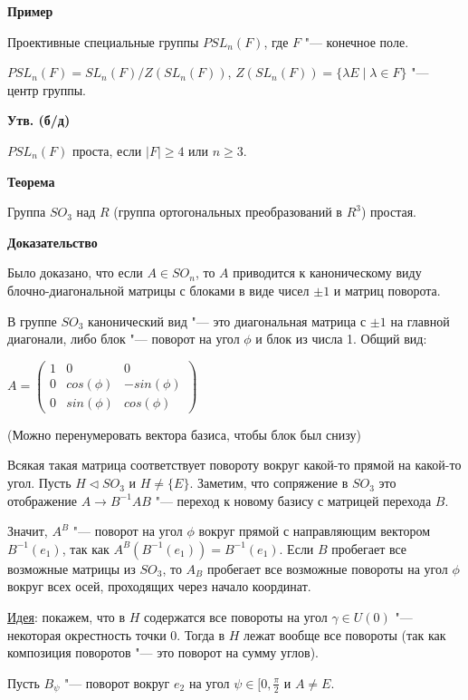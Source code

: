 \documentclass{article}
\begin{document}
\textbf{Пример}

Проективные специальные группы $PSL_n(F)$, где $F$ "--- конечное поле.

$PSL_n(F) = SL_n(F) / Z(SL_n(F))$, $Z(SL_n(F)) = \{\lambda E \mid \lambda \in F\}$ "--- центр группы.

\vspace{5pt}

\textbf{Утв. (б/д)}

$PSL_n(F)$ проста, если $|F| \geq 4$ или $n \geq 3$.

\textbf{Теорема}

Группа $SO_3$ над $R$ (группа ортогональных преобразований в $R^3$) простая.

\textbf{Доказательство}

Было доказано, что если $A \in SO_n$, то $A$ приводится к каноническому виду блочно-диагональной матрицы с блоками в виде чисел $\pm 1$ и матриц поворота.

В группе $SO_3$ канонический вид "--- это диагональная матрица с $\pm 1$ на главной диагонали, либо блок "--- поворот на угол $\phi$ и блок из числа 1. Общий вид:

$A = \begin{pmatrix}
1 & 0 & 0 \\
0 & cos(\phi) & -sin(\phi) \\
0 & sin(\phi) & cos(\phi)
\end{pmatrix}$

(Можно перенумеровать вектора базиса, чтобы блок был снизу)

Всякая такая матрица соответствует повороту вокруг какой-то прямой на какой-то угол. Пусть $H \triangleleft SO_3$ и $H \neq \{E\}$. Заметим, что сопряжение в $SO_3$ это отображение $A \rightarrow B^{-1}AB$ "--- переход к новому базису с матрицей перехода $B$.

Значит, $A^B$ "--- поворот на угол $\phi$ вокруг прямой с направляющим вектором $B^{-1}(e_1)$, так как $A^B(B^{-1}(e_1)) = B^{-1}(e_1)$. Если $B$ пробегает все возможные матрицы из $SO_3$, то $A_B$ пробегает все возможные повороты на угол $\phi$ вокруг всех осей, проходящих через начало координат.

\underline{Идея}: покажем, что в $H$ содержатся все повороты на угол $\gamma \in U(0)$ "--- некоторая окрестность точки 0. Тогда в $H$ лежат вообще все повороты (так как композиция поворотов "--- это поворот на сумму углов).

Пусть $B_{\psi}$ "--- поворот вокруг $e_2$ на угол $\psi \in [0, \frac{\pi}{2}$ и $A \neq E$. 
\end{document}
